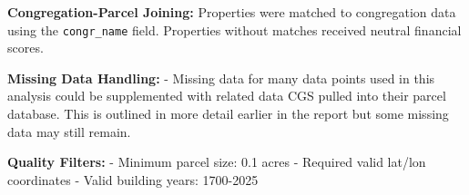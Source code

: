 \documentclass[
  letterpaper,
  DIV=11,
  numbers=noendperiod,
  oneside]{scrreprt}
\begin{document}
\begin{tcolorbox}[enhanced jigsaw, bottomtitle=1mm, left=2mm, rightrule=.15mm, colbacktitle=quarto-callout-note-color!10!white, arc=.35mm, title=\textcolor{quarto-callout-note-color}{\faInfo}\hspace{0.5em}{Data Processing Notes}, bottomrule=.15mm, colback=white, colframe=quarto-callout-note-color-frame, leftrule=.75mm, titlerule=0mm, opacitybacktitle=0.6, breakable, coltitle=black, toptitle=1mm, toprule=.15mm, opacityback=0]

\textbf{Congregation-Parcel Joining:} Properties were matched to
congregation data using the \texttt{congr\_name} field. Properties
without matches received neutral financial scores.

\textbf{Missing Data Handling:} - Missing data for many data points used
in this analysis could be supplemented with related data CGS pulled into
their parcel database. This is outlined in more detail earlier in the
report but some missing data may still remain.

\textbf{Quality Filters:} - Minimum parcel size: 0.1 acres - Required
valid lat/lon coordinates - Valid building years: 1700-2025

\end{tcolorbox}
\end{document}
